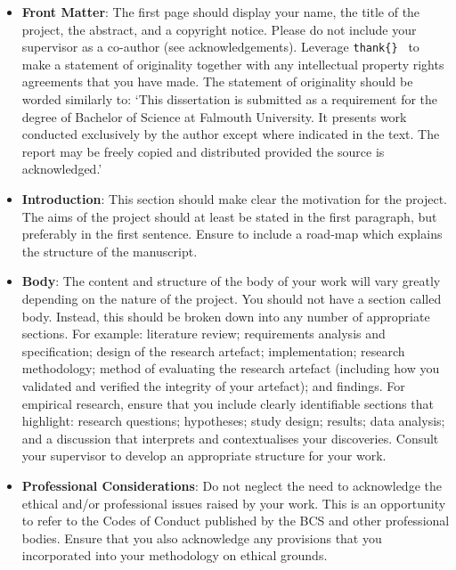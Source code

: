 \begin{itemize}

\setlength\itemsep{1em}

\item \textbf{Front Matter}: The first page should display your name, the title of the project, the abstract, and a copyright notice. Please do not include your supervisor as a co-author (see acknowledgements). Leverage \texttt{thank\{\} } to make a statement of originality together with any intellectual property rights agreements that you have made. The statement of originality should be worded similarly to: `This dissertation is submitted as a requirement for the degree of Bachelor of Science at Falmouth University. It presents work conducted exclusively by the author except where indicated in the text. The report may be freely copied and distributed provided the source is acknowledged.'

\item \textbf{Introduction}: This section should make clear the motivation for the project. The aims of the project should at least be stated in the first paragraph, but preferably in the first sentence. Ensure to include a road-map which explains the structure of the manuscript.

\item \textbf{Body}: The content and structure of the body of your work will vary greatly depending on the nature of the project. You should not have a section called body. Instead, this should be broken down into any number of appropriate sections. For example: literature review; requirements analysis and specification;  design of the research artefact; implementation; research methodology; method of evaluating the research artefact (including how you validated and verified the integrity of your artefact); and findings. For empirical research, ensure that you include clearly identifiable sections that highlight: research questions; hypotheses; study design; results; data analysis; and a discussion that interprets and contextualises your discoveries. Consult your supervisor to develop an appropriate structure for your work.

\item \textbf{Professional Considerations}: Do not neglect the need to acknowledge the ethical and/or professional issues raised by your work. This is an opportunity to refer to the Codes of Conduct published by the BCS and other professional bodies. Ensure that you also acknowledge any provisions that you incorporated into your methodology on ethical grounds.


\end{itemize}
